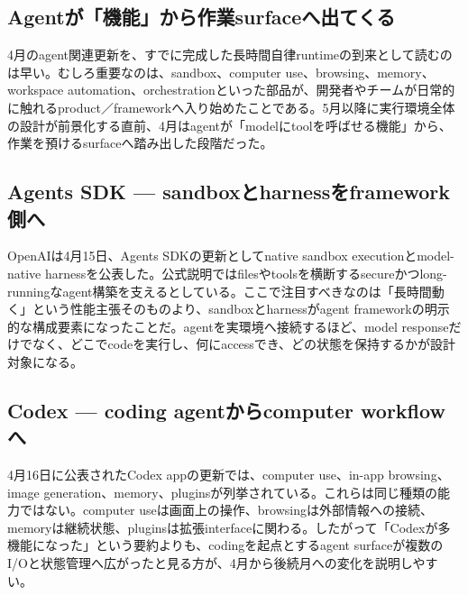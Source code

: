 \begingroup\raggedright
\subsection{Agentが「機能」から作業surfaceへ出てくる}
\par\endgroup

4月のagent関連更新を、すでに完成した長時間自律runtimeの到来として読むのは早い。むしろ重要なのは、sandbox、computer use、browsing、memory、workspace automation、orchestrationといった部品が、開発者やチームが日常的に触れるproduct／frameworkへ入り始めたことである。5月以降に実行環境全体の設計が前景化する直前、4月はagentが「modelにtoolを呼ばせる機能」から、作業を預けるsurfaceへ踏み出した段階だった。\autocite{src-1ecdad90bfb4,src-20e34cbfb714,src-c71ef79e3212,src-f9ff221789e0}


\begingroup\raggedright
\subsection{Agents SDK — sandboxとharnessをframework側へ}
\par\endgroup

OpenAIは4月15日、Agents SDKの更新としてnative sandbox executionとmodel-native harnessを公表した。公式説明ではfilesやtoolsを横断するsecureかつlong-runningなagent構築を支えるとしている。ここで注目すべきなのは「長時間動く」という性能主張そのものより、sandboxとharnessがagent frameworkの明示的な構成要素になったことだ。agentを実環境へ接続するほど、model responseだけでなく、どこでcodeを実行し、何にaccessでき、どの状態を保持するかが設計対象になる。\autocite{src-1ecdad90bfb4}


\begingroup\raggedright
\subsection{Codex — coding agentからcomputer workflowへ}
\par\endgroup

4月16日に公表されたCodex appの更新では、computer use、in-app browsing、image generation、memory、pluginsが列挙されている。これらは同じ種類の能力ではない。computer useは画面上の操作、browsingは外部情報への接続、memoryは継続状態、pluginsは拡張interfaceに関わる。したがって「Codexが多機能になった」という要約よりも、codingを起点とするagent surfaceが複数のI/Oと状態管理へ広がったと見る方が、4月から後続月への変化を説明しやすい。\autocite{src-20e34cbfb714}


